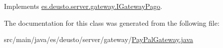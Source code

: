 Implements \mbox{\hyperlink{interfacees_1_1deusto_1_1server_1_1gateway_1_1_i_gateway_pago_ade79cd2d58d4005a6e3e71e9b81c3996}{es.\+deusto.\+server.\+gateway.\+I\+Gateway\+Pago}}.



The documentation for this class was generated from the following file\+:\begin{DoxyCompactItemize}
\item 
src/main/java/es/deusto/server/gateway/\mbox{\hyperlink{_pay_pal_gateway_8java}{Pay\+Pal\+Gateway.\+java}}\end{DoxyCompactItemize}
